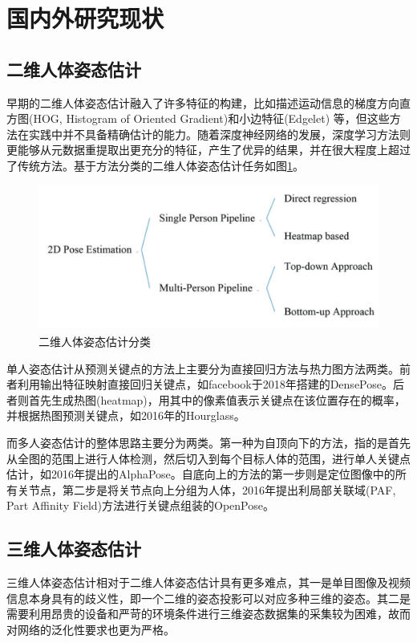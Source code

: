 \section{国内外研究现状}

\subsection{二维人体姿态估计}{}

早期的二维人体姿态估计融入了许多特征的构建，比如描述运动信息的梯度方向直方图(HOG, Histogram of Oriented Gradient)和小边特征(Edgelet)
等，但这些方法在实践中并不具备精确估计的能力。随着深度神经网络的发展，深度学习方法则更能够从元数据重提取出更充分的特征，产生了优异的结果，并在很大程度上超过了传统方法。基于方法分类的二维人体姿态估计任务如图\ref{fig:f5}。

\begin{figure}[h]
	\centering
	\includegraphics[scale=0.6]{figures/5.png}
	\caption{二维人体姿态估计分类\textsuperscript{\cite{p22}}}
	\label{fig:f5}
\end{figure}

单人姿态估计从预测关键点的方法上主要分为直接回归方法与热力图方法两类。前者利用输出特征映射直接回归关键点，如facebook于2018年搭建的DensePose。后者则首先生成热图(heatmap)，用其中的像素值表示关键点在该位置存在的概率，并根据热图预测关键点，如2016年的Hourglass。

而多人姿态估计的整体思路主要分为两类。第一种为自顶向下的方法，指的是首先从全图的范围上进行人体检测，然后切入到每个目标人体的范围，进行单人关键点估计，如2016年提出的AlphaPose。自底向上的方法的第一步则是定位图像中的所有关节点，第二步是将关节点向上分组为人体，2016年提出利局部关联域(PAF, Part Affinity Field)方法进行关键点组装的OpenPose。

\subsection{三维人体姿态估计}{}
三维人体姿态估计相对于二维人体姿态估计具有更多难点，其一是单目图像及视频信息本身具有的歧义性，即一个二维的姿态投影可以对应多种三维的姿态。其二是需要利用昂贵的设备和严苛的环境条件进行三维姿态数据集的采集较为困难，故而对网络的泛化性要求也更为严格。

